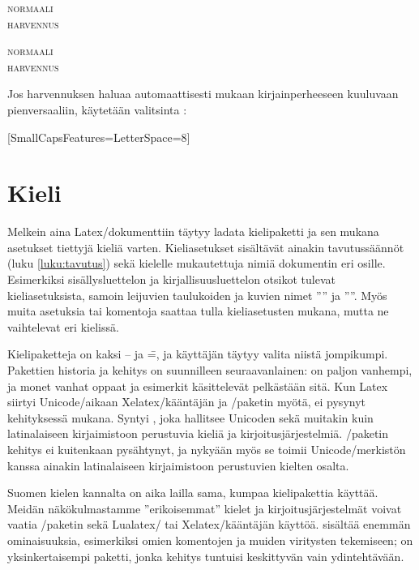 \begin{koodilohkosis}
  \scshape normaali \\
  { harvennus}
\end{koodilohkosis}

\begin{tulossis}
  \scshape normaali \\
  { harvennus}
\end{tulossis}

Jos harvennuksen haluaa automaattisesti mukaan kirjainperheeseen
kuuluvaan pienversaaliin, käytetään valitsinta
:

\begin{koodilohkosis}
  \setmainfont{…}[SmallCapsFeatures={LetterSpace=8}]
\end{koodilohkosis}

\section{Kieli}
\label{luku:kieliasetukset}

Melkein aina Latex\-/dokumenttiin täytyy ladata kielipaketti ja sen
mukana asetukset tiettyjä kieliä varten. Kieliasetukset sisältävät
ainakin tavutussäännöt (luku \ref{luku:tavutus}) sekä kielelle
mukautettuja nimiä dokumentin eri osille. Esimerkiksi sisällysluettelon
ja kirjallisuusluettelon otsikot tulevat kieliasetuksista, samoin
leijuvien taulukoiden ja kuvien nimet ''\tablename'' ja ''\figurename''.
Myös muita asetuksia tai komentoja saattaa tulla kieliasetusten mukana,
mutta ne vaihtelevat eri kielissä.

Kielipaketteja on kaksi --  ja
 \==, ja käyttäjän täytyy
valita niistä jompikumpi. Pakettien historia ja kehitys on suunnilleen
seuraavanlainen:  on paljon vanhempi, ja monet vanhat
oppaat ja esimerkit käsittelevät pelkästään sitä. Kun Latex siirtyi
Unicode\-/aikaan Xelatex\-/kääntäjän ja \-/paketin
myötä,  ei pysynyt kehityksessä mukana. Syntyi
, joka hallitsee Unicoden sekä muitakin kuin
latinalaiseen kirjaimistoon perustuvia kieliä ja kirjoitusjärjestelmiä.
\-/paketin kehitys ei kuitenkaan pysähtynyt, ja nykyään
myös se toimii Unicode\-/merkistön kanssa ainakin latinalaiseen
kirjaimistoon perustuvien kielten osalta.

Suomen kielen kannalta on aika lailla sama, kumpaa kielipakettia
käyttää. Meidän näkökulmastamme ''erikoisemmat'' kielet ja
kirjoitusjärjestelmät voivat vaatia \-/paketin sekä
Lualatex\-/{} tai Xelatex\-/kääntäjän käyttöä.  sisältää
enemmän ominaisuuksia, esimerkiksi omien komentojen ja muiden viritysten
tekemiseen;  on yksinkertaisempi paketti, jonka
kehitys tuntuisi keskittyvän vain ydintehtävään.

